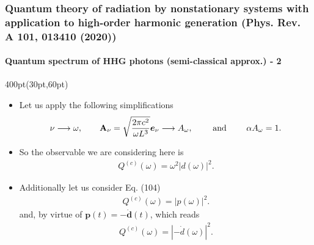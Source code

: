 \begin{frame}
\frametitle{Quantum theory of radiation by nonstationary systems 
	with application to high-order harmonic generation
        (Phys. Rev. A 101, 013410 (2020))}
	\framesubtitle{Quantum spectrum of HHG photons (semi-classical approx.) - 2}

\begin{textblock*}{400pt}(30pt,60pt)
\footnotesize
\begin{itemize}
\item Let us apply the following simplifications
\begin{align}
    \nu \longrightarrow \omega, \hspace{20pt}
  \boldsymbol{\rm A}_\nu = \sqrt{\frac{2\pi c^2}{\omega L^3}}\boldsymbol{e}_\nu
\longrightarrow A_\omega, 
    \hspace{20pt}\mbox{ and } \hspace{20pt} \alpha A_\omega = 1.
\end{align}
\item So the observable we are considering here is 
\begin{align}
    Q^{(c)}(\omega) = \omega^2 \left| d(\omega)  \right|^2.
\end{align}
\item Additionally let us consider Eq. (104)
\begin{align}
    Q^{(c)}(\omega) = \left| p(\omega)  \right|^2.
\end{align}
and, by virtue of $\boldsymbol{p}(t)= -\dot{\boldsymbol{d}}(t)$, which reads
\begin{align}
    Q^{(c)}(\omega) = \left| -\dot{d}(\omega)  \right|^2. 
\label{eqn:dipole_mom_diff}
\end{align}

\end{itemize}
\end{textblock*}


\end{frame}


